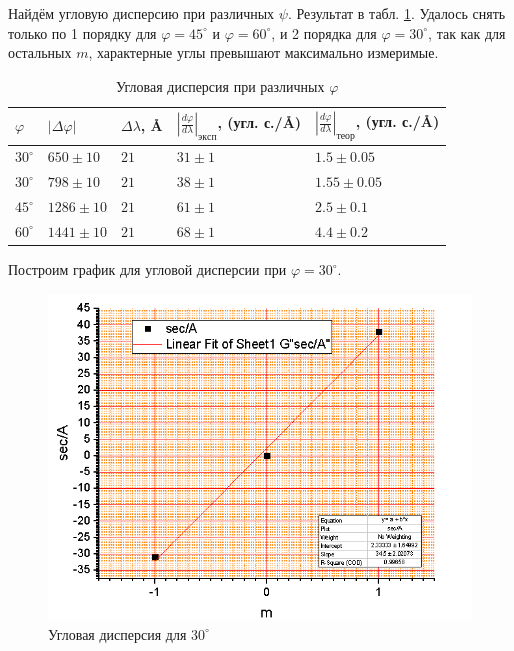 \documentclass[a4paper]{article}
\begin{document}
Найдём угловую дисперсию при различных $ \psi $. Результат в табл. \ref{tab:dispersion}. Удалось снять только по 1 порядку для $\varphi = 45^\circ$ и $ \varphi = 60^\circ $, и 2 порядка для $ \varphi = 30^\circ $, так как для остальных $ m $, характерные углы превышают максимально измеримые.



\begin{table}[]
	\centering
	\begin{tabular}{|l|l|l|l|l|}
		\hline
		$\varphi$ &
		$\left|\Delta \varphi\right|$ &
		$\Delta \lambda$, \AA{} &
		$\left|\frac{d \varphi}{d \lambda}\right|_{эксп}$, (угл. с./\AA{}) &
		$\left|\frac{d \varphi}{d \lambda}\right|_{теор}$, (угл. с./\AA{}) \\ \hline
		$30^\circ$ & $650\pm 10$  & $21$ & $31\pm 1$ & $1.5\pm 0.05$ \\ \hline
		$30^\circ$ & $798\pm 10$  & $21$ & $38\pm 1$ & $1.55\pm 0.05$ \\ \hline
		$45^\circ$ & $1286\pm 10$ & $21$ & $61\pm 1$ & $2.5\pm 0.1$     \\ \hline
		$60^\circ$ & $1441\pm 10$ & $21$ & $68\pm 1$ & $4.4\pm 0.2$     \\ \hline
	\end{tabular}
	\caption{Угловая дисперсия при различных $ \varphi $}
	\label{tab:dispersion}
\end{table}

Построим график для угловой дисперсии при $ \varphi = 30^\circ $.

\begin{figure}[tbp]
	\centering
	\includegraphics[width=0.8\linewidth]{Screenshot_3}
	\caption{Угловая дисперсия для $30^\circ$}
	\label{fig:screenshot3}
\end{figure}
\end{document}
